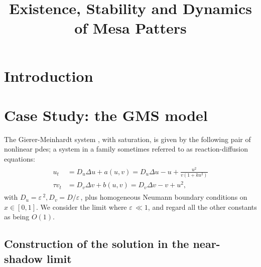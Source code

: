 \documentclass[a4paper,10pt]{article}
\title{Existence, Stability and Dynamics of Mesa Patters}
\author{}
\newcommand{\De}{\ensuremath{\Delta}}
\newcommand{\Ep}{\ensuremath{\varepsilon\,}}
\begin{document}
\maketitle

\begin{abstract}

\end{abstract}

\section{Introduction}

\section{Case Study: the GMS model}

The Gierer-Meinhardt system \cite{gierer_theory_1972}, with saturation, is given by the following pair of nonlinear pdes; a system in a family sometimes referred to as reaction-diffusion equations:
% 
\begin{equation}
\label{eqn:gms1}
\begin{split}
\begin{aligned}
	u_t &= D_u\De u + a(u,v) = D_u\De u - u +\frac{u^2}{v(1+ku^2)} \\
	\tau v_t &= D_v\De v + b(u,v) = D_v\De v - v + u^2,
\end{aligned}
\end{split}
\end{equation}
% 
with $D_u = \Ep^2, D_v = D/\Ep$, plus homogeneous Neumann boundary conditions on $x\in[0,1]$. We consider the limit where $\Ep\ll 1$, and regard all the other constants as being $O(1)$. 

\subsection{Construction of the solution in the near-shadow limit}
\end{document}
